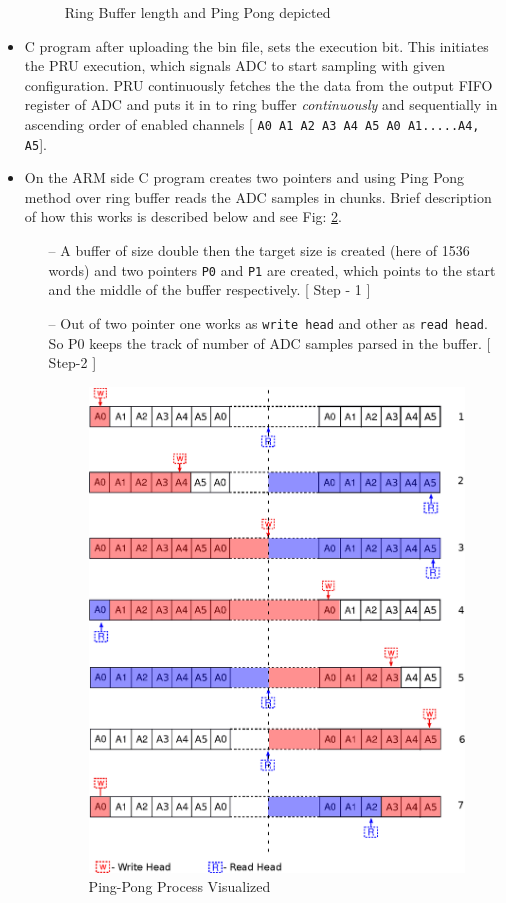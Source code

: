 \begin{itemize}
\begin{figure}[h]
		\caption{Ring Buffer length and Ping Pong depicted}
		\label{fig:rb_pp}
	\end{figure}
	\item C program after uploading the bin file, sets the execution bit. This initiates the PRU execution, which signals ADC to start sampling with given configuration. PRU continuously fetches the the data from the output FIFO register of ADC and puts it in to ring buffer \emph{continuously} and sequentially in ascending order of enabled channels [ \texttt{A0 A1 A2 A3 A4 A5 A0 A1.....A4, A5}].
	\item On the ARM side C program creates two pointers and using Ping Pong method over ring buffer reads the ADC samples in chunks. Brief description of how this works is described below and see Fig: \ref{fig:ping_pong}.
	\begin{itemize}
		\item[--] A buffer of size double then the target size is created (here of 1536 words) and two pointers  \texttt{P0} and \texttt{P1} are created, which points to the start and the middle of the buffer respectively. [ Step - 1 ]
		\item[--] Out of two pointer one works as \texttt{write head} and other as \texttt{read head}. So P0 keeps the track of number of ADC samples parsed in the buffer. [ Step-2 ]
		
		
		\begin{figure}
			\includegraphics[width=\textwidth]{fig/ping_pong.eps}
			\caption{Ping-Pong Process Visualized}
			\label{fig:ping_pong}
		\end{figure}
		

\end{itemize}
\end{itemize}
